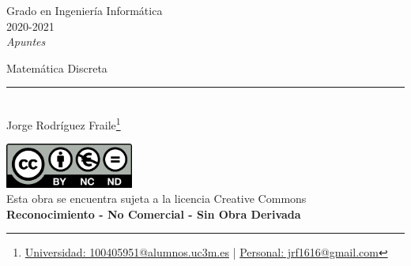 \documentclass[12pt, twoside, openright]{report} %
\begin{document}
	
\begin{titlepage}
	\begin{sffamily}
	\color{azulUC3M}
	\begin{center}
		\begin{figure}[H] %
		\end{figure}
		\vspace{2.5cm}
		\begin{Large}
			Grado en Ingeniería Informática\\			
			2020-2021\\
			\vspace{2cm}		
			\textsl{Apuntes}\\
			\bigskip
		\end{Large}
		 	{\Huge Matemática Discreta}\\
		 	\vspace*{0.5cm}
	 		\rule{10.5cm}{0.1mm}\\
			\vspace*{0.9cm}
			{\LARGE Jorge Rodríguez Fraile\footnote{\href{mailto:100405951@alumnos.uc3m.es}{Universidad: 100405951@alumnos.uc3m.es}  |  \href{mailto:jrf1616@gmail.com}{Personal: jrf1616@gmail.com}}}\\ 
			\vspace*{1cm}
	\end{center}
	\vfill
	\color{black}
		\includegraphics[width=4.2cm]{img/creativecommons.png}\\
		Esta obra se encuentra sujeta a la licencia Creative Commons\\ \textbf{Reconocimiento - No Comercial - Sin Obra Derivada}
	\end{sffamily}
\end{titlepage}


\tableofcontents
\thispagestyle{fancy}
\end{document}

